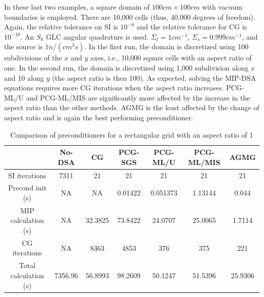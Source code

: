 In these last two examples, a square domain  of $100cm \times 100cm$ with vacuum boundaries
is employed. There are 10,000 cells (thus, 40,000 degrees of freedom). Again, the relative 
tolerance on SI is $10^{-8}$ and the relative tolerance for CG is $10^{-10}$. 
An $S_8$ GLC angular quadrature is used. $\Sigma_t = 1cm^{-1}$, $\Sigma_s = 0.999cm^{-1}$,
and the source is $1n/(cm^3s)$. 
In the first run, the domain is discretized using 100 subdivisions of the $x$ and $y$
axes, i.e., 10,000 square cells with an aspect ratio of one. In the second run, 
the domain is discretized using 1,000 subdivision along $x$ and 10 along $y$ 
(the aspect ratio is then 100).
%
As expected, solving the MIP-DSA equations requires more CG iterations when the aspect
ratio increases. PCG-ML/U and PCG-ML/MIS are significantly more affected by the
increase in the aspect ratio than the other methods. AGMG is the least
affected by the change of aspect ratio and is again the best performing
preconditioner.
%
\begin{table}[!htbp]
  \caption{Comparison of preconditioners for a rectangular grid with an aspect
  ratio of 1}
  \begin{center}
    \begin{tabular}{|c|c|c|c|c|c|c|}
      \hline
       & No-DSA & CG & PCG-SGS & PCG-ML/U & PCG-ML/MIS & AGMG \\
      \hline
      SI iterations & 7311      & 21      & 21      & 21       & 21      & 21 \\
   Precond init (s) & NA        & NA      & 0.01422 & 0.051373 & 1.13144 &
      0.044 \\
MIP calculation (s) & NA        & 32.3825 & 73.8422 & 24.0707  & 25.0065 &
      1.7114 \\
      CG iterations & NA        & 8363    & 4853    & 376      & 375     &
      221\\
Total calculation (s) & 7356.96 & 56.8993 & 98.2609 & 50.1247  & 51.5396 &
      25.9306 \\
      \hline
    \end{tabular}
    \label{table_ar_1}
  \end{center}
\end{table}
%
